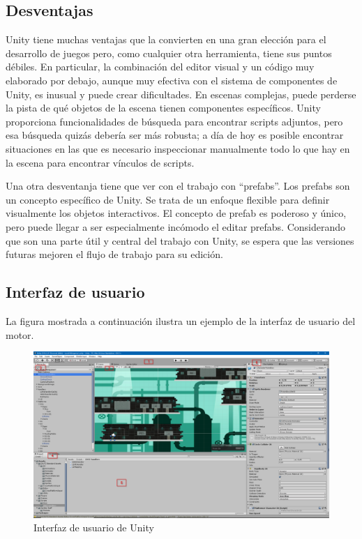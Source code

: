 \subsection{Desventajas}
Unity tiene muchas ventajas que la convierten en una gran elección para el desarrollo de juegos pero, como cualquier otra herramienta, tiene sus puntos débiles. En particular, la combinación del editor visual y un código muy elaborado por debajo, aunque muy efectiva con el sistema de componentes de Unity, es inusual y puede crear dificultades. En escenas complejas, puede perderse la pista de qué objetos de la escena tienen componentes específicos. Unity proporciona funcionalidades de búsqueda para encontrar scripts adjuntos, pero esa búsqueda quizás debería ser más robusta; a día de hoy es posible encontrar situaciones en las que es necesario inspeccionar manualmente todo lo que hay en la escena para encontrar vínculos de scripts.

Una otra desventanja tiene que ver con el trabajo con ``prefabs''. Los prefabs son un concepto específico de Unity. Se trata de un enfoque flexible para definir visualmente los objetos interactivos. El concepto de prefab es poderoso y único, pero puede llegar a ser especialmente incómodo el editar prefabs. Considerando que son una parte útil y central del trabajo con Unity, se espera que las versiones futuras mejoren el flujo de trabajo para su edición.

\subsection{Interfaz de usuario}
La figura mostrada a continuación ilustra un ejemplo de la interfaz de usuario del motor.

\begin{figure}[H]
  \centering
  \includegraphics[scale=0.11]{imagenes/uiunity}
  \caption{Interfaz de usuario de Unity}
  \label{fig:uiunity}
\end{figure} 


